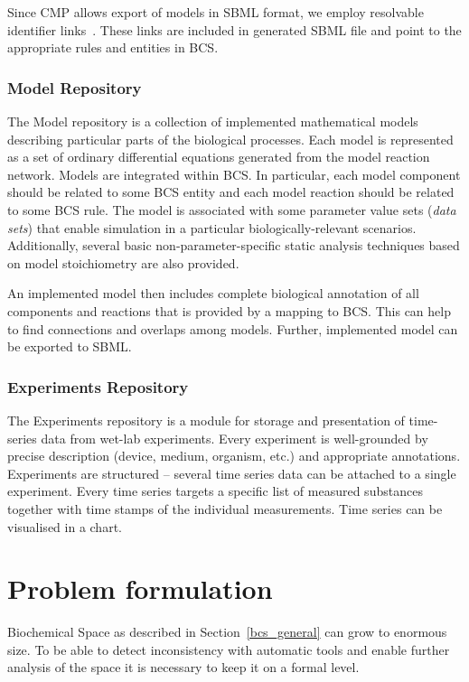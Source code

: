 \documentclass[12pt, twoside]{fithesis2} %
\begin{document}
Since CMP allows export of models in SBML format, we employ resolvable identifier links~\cite{juty2011identifiers}. These links are included in generated SBML file and point to the appropriate rules and entities in BCS.

\subsection{Model Repository}
\label{model}

The Model repository is a collection of implemented mathematical models describing particular parts of the biological processes. Each model is represented as a set of ordinary differential equations generated from the model reaction network. Models are integrated within BCS. In particular, each model component should be related to some BCS entity and each model reaction should be related to some BCS rule. The model is associated with some parameter value sets (\emph{data sets}) that enable simulation in a particular biologically-relevant scenarios. Additionally, several basic non-parameter-specific static analysis techniques based on model stoichiometry are also provided.

An implemented model then includes complete biological annotation of all components and reactions that is provided by a mapping to BCS. This can help to find connections and overlaps among models. Further, implemented model can be exported to SBML.

\subsection{Experiments Repository}

The Experiments repository is a module for storage and presentation of time-series data from wet-lab experiments. Every experiment is well-grounded by precise description (device, medium, organism, etc.) and appropriate annotations. Experiments are structured -- several time series data can be attached to a single experiment. Every time series targets a specific list of measured substances together with time stamps of the individual measurements. Time series can be visualised in a chart.	

\chapter{Problem formulation}
\label{problem_formulation}

Biochemical Space as described in Section~\ref{bcs_general} can grow to enormous size. To be able to detect inconsistency with automatic tools and enable further analysis of the space it is necessary to keep it on a formal level.
\end{document}
